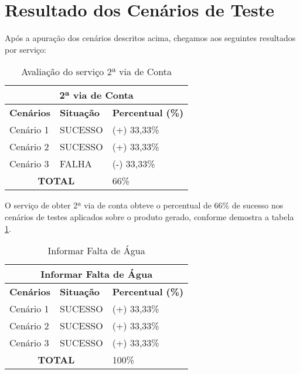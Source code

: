 \section{Resultado dos Cenários de Teste}

Após a apuração dos cenários descritos acima, chegamos aos seguintes resultados por serviço:

\begin{table}[H]
	\center
	\footnotesize
	\caption{Avaliação do serviço 2ª via de Conta }
	\label{tabela:avaliacaoSegundaViaConta}
	\begin{tabular}{|p{3cm}|p{3cm}|p{3cm}|}
		\hline
		\multicolumn{3}{|c|}{\textbf{2ª via de Conta}} \\
		\hline
		\textbf{Cenários}  	& \textbf{Situação} & \textbf{Percentual (\%)}  \\
		\hline		
		Cenário 1			& SUCESSO 		& (+) 33,33\% 	\\
		\hline
		Cenário 2 			& SUCESSO		& (+) 33,33\% 	\\
		\hline
		Cenário 3 			& FALHA 		& (-) 33,33\%	\\
		\hline		
		\multicolumn{2}{|c|}{\textbf{TOTAL}}	& 66\% 	\\
		\hline				
	\end{tabular}
\end{table}

O serviço de obter 2ª via de conta obteve o percentual de 66\% de sucesso nos cenários de testes aplicados sobre o produto gerado, conforme demostra a tabela \ref{tabela:avaliacaoSegundaViaConta}. 


\begin{table}[H]
	\center
	\footnotesize
	\caption{Informar Falta de Água}
	\label{tabela:avaliacaoInformarFaltaAgua}
	\begin{tabular}{|p{3cm}|p{3cm}|p{3cm}|}
		\hline
		\multicolumn{3}{|c|}{\textbf{Informar Falta de Água}} \\
		\hline
		\textbf{Cenários}  	& \textbf{Situação} & \textbf{Percentual (\%)}  \\
		\hline		
		Cenário 1			& SUCESSO 		& (+) 33,33\% 	\\
		\hline
		Cenário 2 			& SUCESSO		& (+) 33,33\% 	\\
		\hline
		Cenário 3 			& SUCESSO 		& (+) 33,33\%	\\
		\hline		
		\multicolumn{2}{|c|}{\textbf{TOTAL}}	& 100\% 	\\
		\hline				
	\end{tabular}
\end{table}

